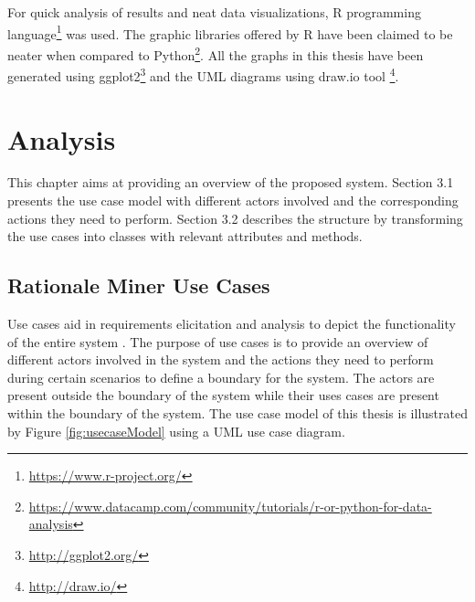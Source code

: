 \documentclass[a4paper,12pt,twoside]{report}
\begin{document}
\newline \newline
For quick analysis of results and neat data visualizations, R programming language\footnote{\url{https://www.r-project.org/}} was used. The graphic libraries offered by R have been claimed to be neater when compared to Python\footnote{\url{https://www.datacamp.com/community/tutorials/r-or-python-for-data-analysis}}. All the graphs in this thesis have been generated using ggplot2\footnote{\url{http://ggplot2.org/}} and the UML diagrams using draw.io tool \footnote{\url{http://draw.io/}}.

\chapter{Analysis}
This chapter aims at providing an overview of the proposed system. Section 3.1 presents the use case model with different actors involved and the corresponding actions they need to perform. Section 3.2 describes the structure by transforming the use cases into classes with relevant attributes and methods. 

\section{Rationale Miner Use Cases}
Use cases aid in requirements elicitation and analysis to depict the functionality of the entire system \cite{Bruegge2009}. The purpose of use cases is to provide an overview of different actors involved in the system and the actions they need to perform during certain scenarios to define a boundary for the system. The actors are present outside the boundary of the system while their uses cases are present within the boundary of the system. The use case model of this thesis is illustrated by Figure \ref{fig:usecaseModel} using a UML use case diagram. 
\end{document}
